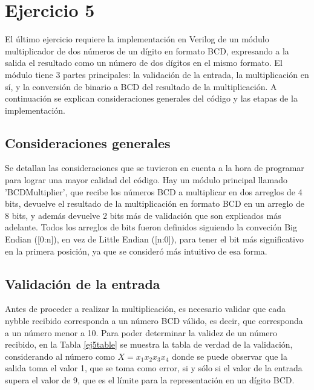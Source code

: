 \section{Ejercicio 5}

\noindent
El \'ultimo ejercicio requiere la implementaci\'on en Verilog de un m\'odulo multiplicador de dos n\'umeros de un d\'igito en formato BCD, expresando a la salida el resultado como un n\'umero de dos d\'igitos en el mismo formato. \newline
El m\'odulo tiene 3 partes principales: la validaci\'on de la entrada, la multiplicaci\'on en s\'i, y la conversi\'on de binario a BCD del resultado de la multiplicaci\'on. A continuaci\'on se explican consideraciones generales del c\'odigo y las etapas de la implementaci\'on.

\subsection{Consideraciones generales}
\noindent
Se detallan las consideraciones que se tuvieron en cuenta a la hora de programar para lograr una mayor calidad del c\'odigo. 
Hay un m\'odulo principal llamado 'BCDMultiplier', que recibe los n\'umeros BCD a multiplicar en dos arreglos de 4 bits, devuelve el resultado de la multiplicaci\'on en formato BCD en un arreglo de 8 bits, y adem\'as devuelve 2 bits m\'as de validaci\'on que son explicados m\'as adelante.
Todos los arreglos de bits fueron definidos siguiendo la conveci\'on Big Endian ([0:n]), en vez de Little Endian ([n:0]), para tener el bit m\'as significativo en la primera posici\'on, ya que se consider\'o m\'as intuitivo de esa forma. \newline



\subsection{Validaci\'on de la entrada}
\noindent
Antes de proceder a realizar la multiplicaci\'on, es necesario validar que cada nybble recibido corresponda a un n\'umero BCD v\'alido, es decir, que corresponda  a un n\'umero menor a 10. Para poder determinar la validez de un n\'umero recibido, en la Tabla \ref{ej5table} se muestra la tabla de verdad de la validaci\'on, considerando al n\'umero como $X = x_1x_2x_3x_4$ donde se puede observar que la salida toma el valor 1, que se toma como error, si y s\'olo si el valor de la entrada supera el valor de 9, que es el l\'imite para la representaci\'on en un d\'igito BCD.

